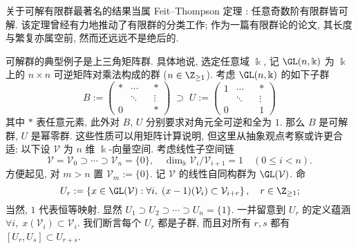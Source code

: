 关于可解有限群最著名的结果当属 Feit--Thompson 定理 \cite{FT63}: 任意奇数阶有限群皆可解. 该定理曾经有力地推动了有限群的分类工作; 作为一篇有限群论的论文, 其长度与繁复亦属空前, 然而还远远不是绝后的.

\begin{example}
	可解群的典型例子是上三角矩阵群. 具体地说, 选定任意域 $\Bbbk$, 记 $\GL(n,\Bbbk)$ 为 $\Bbbk$ 上的 $n \times n$ 可逆矩阵对乘法构成的群 ($n \in \Z_{\geq 1}$). 考虑 $\GL(n, \Bbbk)$ 的如下子群
	\[
		B := \begin{pmatrix}
		* & \cdots & & * \\
		& \ddots & & \vdots \\
		0 & & & *
	\end{pmatrix} \; \supset \;
		U := \begin{pmatrix}
		1 & \cdots & & * \\
		& \ddots & & \vdots \\
		0 & & & 1
	\end{pmatrix} \]
	其中 $*$ 表任意元素, 此外对 $B$, $U$ 分别要求对角元全可逆和全为 $1$. 那么 $B$ 是可解群, $U$ 是幂零群. 这些性质可以用矩阵计算说明, 但这里从抽象观点考察或许更合适: 以下设 $\mathcal{V}$ 为 $n$ 维 $\Bbbk$-向量空间. 考虑线性子空间链
	\[ \mathcal{V} = \mathcal{V}_0 \supset \cdots \supset \mathcal{V}_n = \{0\}, \quad \dim_\Bbbk \mathcal{V}_i/\mathcal{V}_{i+1} = 1 \quad (0 \leq i < n). \]
	方便起见, 对 $m > n$ 置 $\mathcal{V}_m := \{0\}$. 记 $\mathcal{V}$ 的线性自同构群为 $\GL(\mathcal{V})$. 命
	\begin{equation*}
		U_r := \left\{ x \in \GL(\mathcal{V}) : \forall i, \; (x - 1)(\mathcal{V}_i) \subset \mathcal{V}_{i+r} \right\}, \quad r \in \Z_{\geq 1};
	\end{equation*}
	当然, $1$ 代表恒等映射. 显然 $U_1 \supset U_2 \supset \cdots \supset U_n = \{1\}$. 一并留意到 $U_r$ 的定义蕴涵 $\forall i, \; x(\mathcal{V}_i) \subset \mathcal{V}_i$. 我们断言每个 $U_r$ 都是子群, 而且对所有 $r,s$ 都有 $[U_r, U_s] \subset U_{r+s}$.


\end{example}
